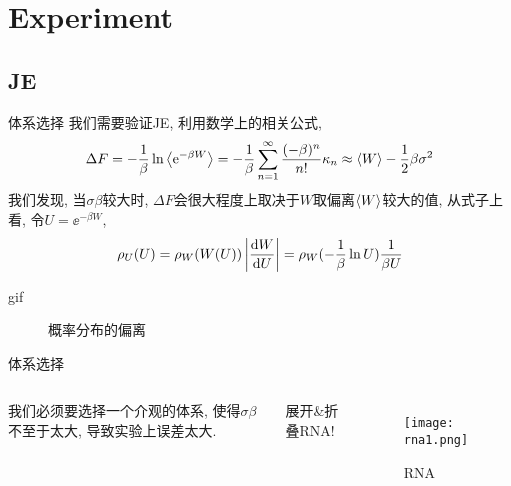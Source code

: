\section{Experiment}
    \subsection{JE}
    \begin{frame}{体系选择}
        我们需要验证JE, 利用数学上的相关公式,
        \begin{equation}
            \Delta F = -\frac1\beta \ln \expval{\mathrm{e}^{-\beta W}} 
            = -\frac1\beta \sum_{n=1}^\infty \frac{(-\beta)^n}{n!} \kappa_n 
            \approx \expval{W} - \frac12\beta\sigma^2
        \end{equation}
        我们发现, 当$\sigma\beta$较大时, $\Delta F$会很大程度上取决于$W$取偏离$\expval{W}$较大的值, 从式子上看, 令$U = \ee^{-\beta W}$,
        \begin{equation}
            \rho_U(U) = \rho_W(W(U)) \left|\dv{W}{U}\right| = \rho_W(-\frac1\beta\ln U) \frac1{\beta U}
        \end{equation}
    \end{frame}
    \begin{frame}{gif}
        \begin{figure}[H]
            \centering
            \caption{概率分布的偏离}
        \end{figure}
    \end{frame}
    \begin{frame}{体系选择}
        \begin{columns}
            我们必须要选择一个介观的体系, 使得$\sigma\beta$不至于太大, 导致实验上误差太大. 
            \pause
            \begin{center}
                {\Large 展开\&折叠RNA!}
            \end{center}
            \begin{figure}
                \centering
                \texttt{[image: rna1.png]}
                \caption{RNA}
            \end{figure}
        \end{columns}
    \end{frame}
